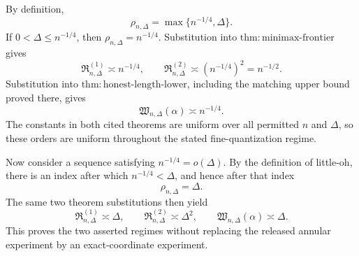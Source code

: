 By definition,
\[
 \rho_{n,\Delta}=\max\{n^{-1/4},\Delta\}.
\]
If \(0<\Delta\leq n^{-1/4}\), then \(\rho_{n,\Delta}=n^{-1/4}\).  Substitution into \(\mathrm{thm:minimax\text{-}frontier}\) gives
\[
 \mathfrak R^{(1)}_{n,\Delta}\asymp n^{-1/4},
 \qquad
 \mathfrak R^{(2)}_{n,\Delta}\asymp(n^{-1/4})^2=n^{-1/2}.
\]
Substitution into \(\mathrm{thm:honest\text{-}length\text{-}lower}\), including the matching upper bound proved there, gives
\[
 \mathfrak W_{n,\Delta}(\alpha)\asymp n^{-1/4}.
\]
The constants in both cited theorems are uniform over all permitted \(n\) and \(\Delta\), so these orders are uniform throughout the stated fine-quantization regime.

Now consider a sequence satisfying \(n^{-1/4}=o(\Delta)\).  By the definition of little-oh, there is an index after which \(n^{-1/4}<\Delta\), and hence after that index
\[
 \rho_{n,\Delta}=\Delta.
\]
The same two theorem substitutions then yield
\[
 \mathfrak R^{(1)}_{n,\Delta}\asymp\Delta,
 \qquad
 \mathfrak R^{(2)}_{n,\Delta}\asymp\Delta^2,
 \qquad
 \mathfrak W_{n,\Delta}(\alpha)\asymp\Delta.
\]
This proves the two asserted regimes without replacing the released annular experiment by an exact-coordinate experiment.